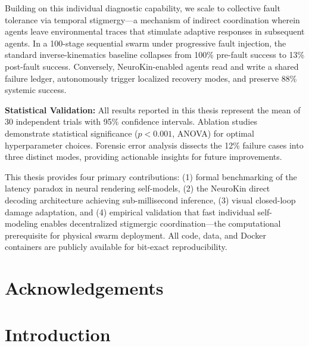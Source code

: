 \documentclass[12pt,a4paper,oneside]{report}
\begin{document}
Building on this individual diagnostic capability, we scale to collective fault tolerance via temporal stigmergy---a mechanism of indirect coordination wherein agents leave environmental traces that stimulate adaptive responses in subsequent agents. In a 100-stage sequential swarm under progressive fault injection, the standard inverse-kinematics baseline collapses from 100\% pre-fault success to 13\% post-fault success. Conversely, NeuroKin-enabled agents read and write a shared failure ledger, autonomously trigger localized recovery modes, and preserve 88\% systemic success.

\textbf{Statistical Validation:} All results reported in this thesis represent the mean of 30 independent trials with 95\% confidence intervals. Ablation studies demonstrate statistical significance ($p < 0.001$, ANOVA) for optimal hyperparameter choices. Forensic error analysis dissects the 12\% failure cases into three distinct modes, providing actionable insights for future improvements.

This thesis provides four primary contributions: (1) formal benchmarking of the latency paradox in neural rendering self-models, (2) the NeuroKin direct decoding architecture achieving sub-millisecond inference, (3) visual closed-loop damage adaptation, and (4) empirical validation that fast individual self-modeling enables decentralized stigmergic coordination---the computational prerequisite for physical swarm deployment. All code, data, and Docker containers are publicly available for bit-exact reproducibility.
\clearpage

\chapter*{Acknowledgements}


\tableofcontents
\clearpage

\chapter{Introduction}
\label{chap:introduction}

\end{document}
